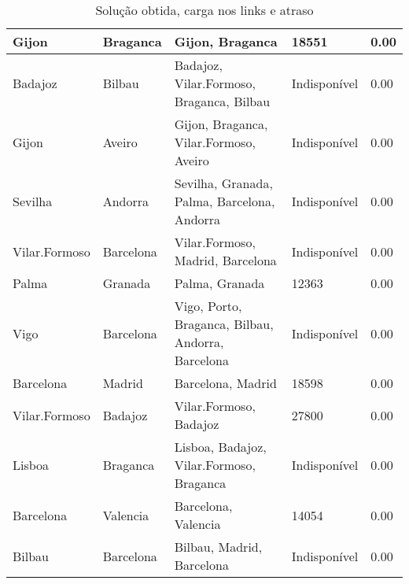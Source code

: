 \begin{table}[!htb]
{\begin{tabular}{|l|l|l|l|l|}
Gijon & Braganca & Gijon, Braganca & 18551 & 0.00 \\ \hline
Badajoz & Bilbau & Badajoz, Vilar.Formoso, Braganca, Bilbau & Indisponível & 0.00 \\ \hline
Gijon & Aveiro & Gijon, Braganca, Vilar.Formoso, Aveiro & Indisponível & 0.00 \\ \hline
Sevilha & Andorra & Sevilha, Granada, Palma, Barcelona, Andorra & Indisponível & 0.00 \\ \hline
Vilar.Formoso & Barcelona & Vilar.Formoso, Madrid, Barcelona & Indisponível & 0.00 \\ \hline
Palma & Granada & Palma, Granada & 12363 & 0.00 \\ \hline
Vigo & Barcelona & Vigo, Porto, Braganca, Bilbau, Andorra, Barcelona & Indisponível & 0.00 \\ \hline
Barcelona & Madrid & Barcelona, Madrid & 18598 & 0.00 \\ \hline
Vilar.Formoso & Badajoz & Vilar.Formoso, Badajoz & 27800 & 0.00 \\ \hline
Lisboa & Braganca & Lisboa, Badajoz, Vilar.Formoso, Braganca & Indisponível & 0.00 \\ \hline
Barcelona & Valencia & Barcelona, Valencia & 14054 & 0.00 \\ \hline
Bilbau & Barcelona & Bilbau, Madrid, Barcelona & Indisponível & 0.00 \\ \hline
\end{tabular}}
\caption[]{Solução obtida, carga nos links e atraso}
\end{table}

